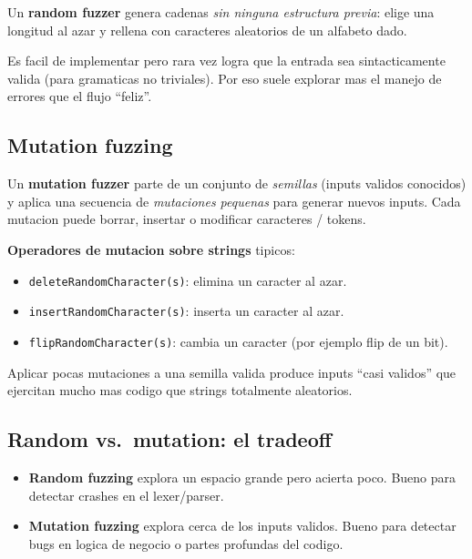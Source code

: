 \documentclass[12pt,a4paper]{article}
\begin{document}
\begin{definicionbox}
Un \textbf{random fuzzer} genera cadenas \emph{sin ninguna estructura previa}: elige una
longitud al azar y rellena con caracteres aleatorios de un alfabeto dado.
\end{definicionbox}

Es facil de implementar pero rara vez logra que la entrada sea sintacticamente valida (para
gramaticas no triviales). Por eso suele explorar mas el manejo de errores que el flujo
``feliz''.

\subsection{Mutation fuzzing}

\begin{definicionbox}
Un \textbf{mutation fuzzer} parte de un conjunto de \emph{semillas} (inputs validos conocidos)
y aplica una secuencia de \emph{mutaciones pequenas} para generar nuevos inputs. Cada mutacion
puede borrar, insertar o modificar caracteres / tokens.
\end{definicionbox}

\textbf{Operadores de mutacion sobre strings} tipicos:

\begin{itemize}
  \item \texttt{deleteRandomCharacter(s)}: elimina un caracter al azar.
  \item \texttt{insertRandomCharacter(s)}: inserta un caracter al azar.
  \item \texttt{flipRandomCharacter(s)}: cambia un caracter (por ejemplo flip de un bit).
\end{itemize}

Aplicar pocas mutaciones a una semilla valida produce inputs ``casi validos'' que ejercitan
mucho mas codigo que strings totalmente aleatorios.

\subsection{Random vs.\ mutation: el tradeoff}

\begin{itemize}
  \item \textbf{Random fuzzing} explora un espacio grande pero acierta poco. Bueno para
  detectar crashes en el lexer/parser.
  \item \textbf{Mutation fuzzing} explora cerca de los inputs validos. Bueno para detectar
  bugs en logica de negocio o partes profundas del codigo.
\end{itemize}
\end{document}
